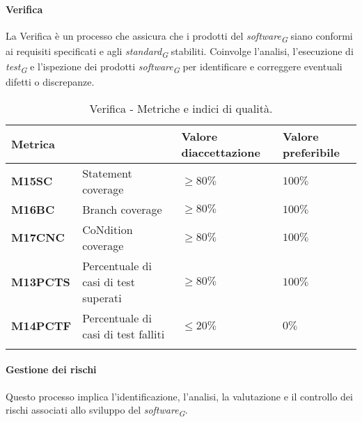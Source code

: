 \vspace{0.5cm}

\paragraph{Verifica}
La Verifica è un processo che assicura che i prodotti del \textit{software}\textsubscript{\textit{G}} siano conformi ai requisiti specificati e agli \textit{standard}\textsubscript{\textit{G}} stabiliti. Coinvolge l'analisi, l'esecuzione di \textit{test}\textsubscript{\textit{G}} e l'ispezione dei prodotti \textit{software}\textsubscript{\textit{G}} per identificare e correggere eventuali difetti o discrepanze.

\vspace{0.4cm}

\begin{longtable}{|C{1.9cm}|L{4cm}|L{2.2cm}|L{2.1cm}|}
    \hline
    \textbf{Metrica} &  & \textbf{Valore di\linebreak accettazione} & {\textbf{Valore \linebreak preferibile}} \\
    \hline \hline

    \textbf{M15SC} & Statement coverage & $\geq 80\%$ & $100\%$ \\
    \hline

    \textbf{M16BC} & Branch coverage & $\geq 80\%$ & $100\%$ \\
    \hline

    \textbf{M17CNC} & CoNdition coverage & $\geq 80\%$ & $100\%$ \\
    \hline

    \textbf{M13PCTS} & Percentuale di casi di test superati & $\geq 80\%$ & $100\%$ \\
    \hline

    \textbf{M14PCTF} & Percentuale di casi di test falliti & $\leq 20\%$ & $0\%$ \\
    \hline

\caption{Verifica - Metriche e indici di qualità.}
\label{tab:metriche_verifica}
\end{longtable}

\vspace{0.5cm}

\paragraph{Gestione dei rischi}
Questo processo implica l'identificazione, l'analisi, la valutazione e il controllo dei rischi associati allo sviluppo del \textit{software}\textsubscript{\textit{G}}. 

